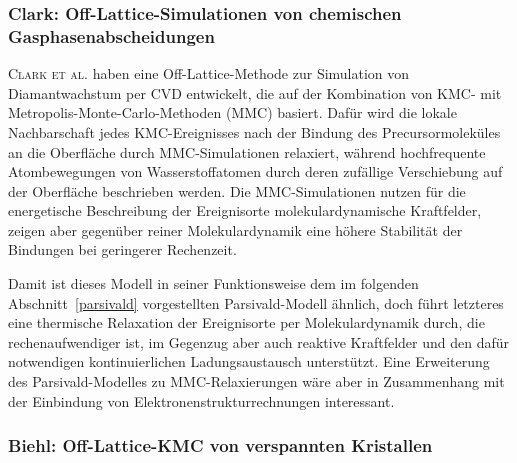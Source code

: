 \subsubsection{Clark: Off-Lattice-Simulationen von chemischen Gasphasenabscheidungen}

\textsc{Clark et al.}\cite{clark_hybrid_1996} haben eine Off-Lattice-Methode zur Simulation von Diamantwachstum per CVD entwickelt, die auf der Kombination von KMC- mit Metropolis-Monte-Carlo-Methoden (MMC) basiert.
Dafür wird die lokale Nachbarschaft jedes KMC-Ereignisses nach der Bindung des Precursormoleküles an die Oberfläche durch MMC-Simulationen relaxiert, während hochfrequente Atombewegungen von Wasserstoffatomen durch deren zufällige Verschiebung auf der Oberfläche beschrieben werden.
Die MMC-Simulationen nutzen für die energetische Beschreibung der Ereignisorte molekulardynamische Kraftfelder, zeigen aber gegenüber reiner Molekulardynamik eine höhere Stabilität der Bindungen bei geringerer Rechenzeit.

Damit ist dieses Modell in seiner Funktionsweise dem im folgenden Abschnitt~\ref{parsivald} vorgestellten Parsivald-Modell ähnlich, doch führt letzteres eine thermische Relaxation der Ereignisorte per Molekulardynamik durch, die rechenaufwendiger ist, im Gegenzug aber auch reaktive Kraftfelder und den dafür notwendigen kontinuierlichen Ladungsaustausch unterstützt.
Eine Erweiterung des Parsivald-Modelles zu MMC-Relaxierungen wäre aber in Zusammenhang mit der Einbindung von Elektronenstrukturrechnungen interessant.

\subsubsection{Biehl: Off-Lattice-KMC von verspannten Kristallen}

